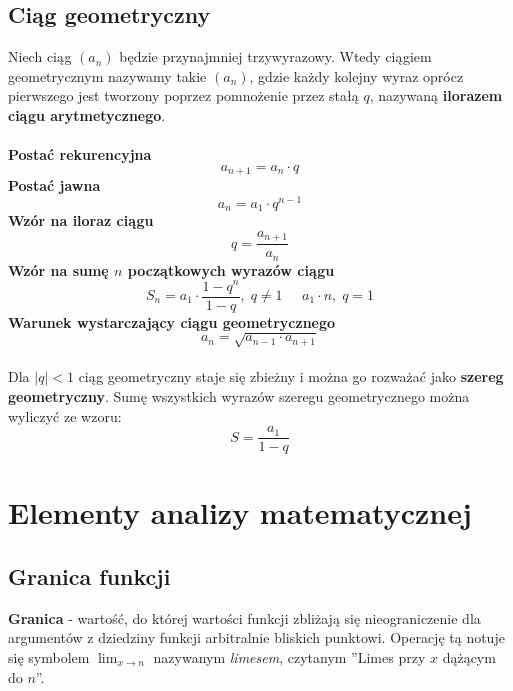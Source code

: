\documentclass[14pt,a4paper]{extarticle}
\begin{document}
\subsection{Ciąg geometryczny}
\noindent Niech ciąg $(a_{n})$ będzie przynajmniej trzywyrazowy. Wtedy ciągiem geometrycznym nazywamy takie $(a_{n})$,
gdzie każdy kolejny wyraz oprócz pierwszego jest tworzony poprzez pomnożenie przez stałą $q$, nazywaną \textbf{ilorazem ciągu arytmetycznego}.\\\\
\noindent\textbf{Postać rekurencyjna}
$$a_{n+1} = a_{n}\cdot q$$
\noindent\textbf{Postać jawna}
$$a_{n} = a_{1} \cdot q^{n-1}$$
\noindent\textbf{Wzór na iloraz ciągu}
$$q = \dfrac{a_{n+1}}{a_{n}}$$
\noindent\textbf{Wzór na sumę $n$ początkowych wyrazów ciągu}
$$S_{n} = a_{1}\cdot\dfrac{1-q^{n}}{1-q},\; q \neq 1\;\;\;\;\; a_{1}\cdot n,\; q = 1$$
\noindent\textbf{Warunek wystarczający ciągu geometrycznego}
$$a_{n} = \sqrt{a_{n-1}\cdot a_{n+1}}$$
\\

\noindent Dla $\vert q\vert < 1$ ciąg geometryczny staje się zbieżny i można go rozważać jako \textbf{szereg geometryczny}.
Sumę wszystkich wyrazów szeregu geometrycznego można wyliczyć ze wzoru:
$$S = \dfrac{a_{1}}{1-q}$$

\newpage

\section{Elementy analizy matematycznej}
\subsection{Granica funkcji}
\noindent\textbf{Granica} - wartość, do której wartości funkcji zbliżają się nieograniczenie dla argumentów
z dziedziny funkcji arbitralnie bliskich punktowi. Operację tą notuje się symbolem $\displaystyle\lim_{x\to n}$ nazywanym \textit{limesem}, czytanym ''Limes przy $x$ dążącym do $n$''.\hfill\break\\
\end{document}
